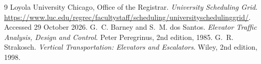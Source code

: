 \begin{thebibliography}{9}
 Loyola University Chicago, Office of the Registrar. \emph{University Scheduling Grid}.
\url{https://www.luc.edu/regrec/facultystaff/scheduling/universityschedulinggrid/}. Accessed 29 October 2026.
 G.~C. Barney and S.~M. dos Santos. \emph{Elevator Traffic Analysis, Design and Control}.
Peter Peregrinus, 2nd edition, 1985.
 G.~R. Strakosch. \emph{Vertical Transportation: Elevators and Escalators}. Wiley,
2nd edition, 1998.
\end{thebibliography}
